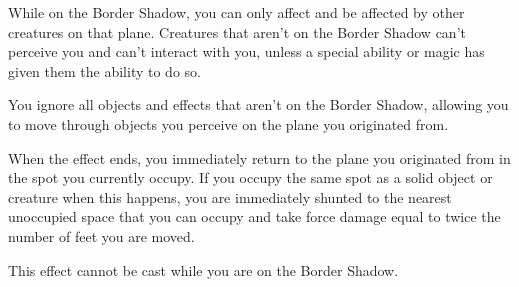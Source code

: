 While on the  Border Shadow, you can only affect and be affected by other creatures on that plane. Creatures that aren't on the Border Shadow can't perceive you and can't interact with you, unless a special ability or magic has given them the ability to do so.

You ignore all objects and effects that aren't on the Border Shadow, allowing you to move through objects you perceive on the plane you originated from.

When the effect ends, you immediately return to the plane you originated from in the spot you currently occupy. If you occupy the same spot as a solid object or creature when this happens, you are immediately shunted to the nearest unoccupied space that you can occupy and take force damage equal to twice the number of feet you are moved.

This effect cannot be cast while you are on the Border Shadow.










